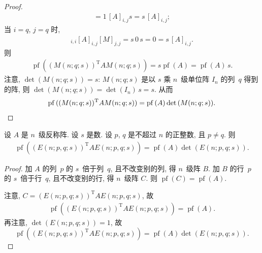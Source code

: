 \documentclass[../libro.tex]{subfiles}
\begin{document}
\begin{proof}
\begin{align*}
        = 1\, [A]_{i,j} s
        = s\, [A]_{i,j};
    \end{align*}
    当 \(i = q\), \(j = q\) 时,
    \begin{align*}
        [M]_{i,i}
        [A]_{i,j}
        [M]_{j,j}
        = s\, 0\, s
        = 0
        = s\, [A]_{i,j}.
    \end{align*}
    则
    \begin{align*}
        \operatorname{pf}{( (M(n; q; s))^{\mathrm{T}}
        A M(n; q; s) )}
        = s \operatorname{pf} {(A)}
        = \operatorname{pf} {(A)}\, s.
    \end{align*}
    注意, \(\det {(M(n; q; s))} = s\):
    \(M(n; q; s)\) 是以 \(s\) 乘
    \(n\)~级单位阵 \(I_n\) 的列~\(q\) 得到的阵,
    则 \(\det {(M(n; q; s))} = \det {(I_n)}\, s = s\).
    从而
    \begin{equation*}
        \operatorname{pf}{( (M(n; q; s))^{\mathrm{T}}
        A M(n; q; s) )}
        = \operatorname{pf} {(A)} \det {(M(n; q; s))}.
        \qedhere
    \end{equation*}
\end{proof}

\begin{theorem}
    设 \(A\) 是 \(n\)~级反称阵.
    设 \(s\) 是数.
    设 \(p\), \(q\) 是不超过 \(n\) 的正整数,
    且 \(p \neq q\).
    则
    \begin{align*}
        \operatorname{pf}{( (E(n; p, q; s))^{\mathrm{T}}
        A E(n; p, q; s) )}
        = \operatorname{pf} {(A)} \det {(E(n; p, q; s))}.
    \end{align*}
\end{theorem}

\begin{proof}
    加 \(A\) 的列~\(p\) 的 \(s\)~倍于列~\(q\),
    且不改变别的列, 得 \(n\)~级阵 \(B\).
    加 \(B\) 的行~\(p\) 的 \(s\)~倍于行~\(q\),
    且不改变别的行, 得 \(n\)~级阵 \(C\).
    则 \(\operatorname{pf} {(C)} = \operatorname{pf} {(A)}\).

    注意, \(C = (E(n; p, q; s))^{\mathrm{T}}
    A E(n; p, q; s)\),
    故
    \begin{align*}
        \operatorname{pf}{( (E(n; p, q; s))^{\mathrm{T}}
        A E(n; p, q; s) )} = \operatorname{pf} {(A)}.
    \end{align*}
    再注意, \(\det {(E(n; p, q; s))} = 1\),
    故
    \begin{equation*}
        \operatorname{pf}{( (E(n; p, q; s))^{\mathrm{T}}
        A E(n; p, q; s) )}
        =
        \operatorname{pf} {(A)}
        \det {(E(n; p, q; s))}.
    \end{equation*}
\end{proof}
\end{document}
